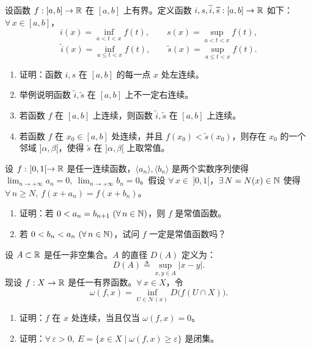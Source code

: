 \begin{exercise}
	\item 设函数 \(f:[a,b]\to\mathbb{R}\) 在 \([a,b]\) 上有界。定义函数 \(i,s,\widetilde i,\widetilde s:[a,b]\to\mathbb{R}\) 如下：\(\forall\,x\in[a,b]\)，
	\[
	i(x)=\inf_{a<t<x}f(t),\qquad s(x)=\sup_{a<t<x}f(t),
	\]
	\[
	\widetilde i(x)=\inf_{a\le t<x}f(t),\qquad \widetilde s(x)=\sup_{a\le t<x}f(t).
	\]
	\begin{enumerate}[label=\arabic*)]
		\item 证明：函数 \(i,s\) 在 \([a,b]\) 的每一点 \(x\) 处左连续。
		\item 举例说明函数 \(\widetilde i,\widetilde s\) 在 \([a,b]\) 上不一定右连续。
		\item 若函数 \(f\) 在 \([a,b]\) 上连续，则函数 \(\widetilde i,\widetilde s\) 在 \([a,b]\) 上连续。
		\item 若函数 \(f\) 在 \(x_0\in[a,b]\) 处连续，并且 \(f(x_0)<\widetilde s(x_0)\)，则存在 \(x_0\) 的一个邻域 \(]\alpha,\beta[\)，使得 \(\widetilde s\) 在 \(]\alpha,\beta[\) 上取常值。
	\end{enumerate}
\end{exercise}

\begin{exercise}
	\item 设 \(f:\ ]0,1[\to\mathbb{R}\) 是任一连续函数，\(\langle a_n\rangle,\langle b_n\rangle\) 是两个实数序列使得 \(\lim_{n\to+\infty}a_n=0,\ \lim_{n\to+\infty}b_n=0\)。假设 \(\forall\,x\in\ ]0,1[\)，\(\exists\,N=N(x)\in\mathbb{N}\) 使得 \(\forall\,n\ge N,\ f(x+a_n)=f(x+b_n)\)。
	\begin{enumerate}[label=\arabic*)]
		\item 证明：若 \(0<a_n=b_{n+1}\ (\forall\,n\in\N)\)，则 \(f\) 是常值函数。
		\item 若 \(0<b_n<a_n\ (\forall\,n\in\N)\)，试问 \(f\) 一定是常值函数吗？
	\end{enumerate}
\end{exercise}

\begin{exercise}
	\item 设 \(A\subset\mathbb{R}\) 是任一非空集合。\(A\) 的直径 \(D(A)\) 定义为：
	\[
	D(A)\triangleq\sup_{x,y\in A}|x-y|.
	\]
	现设 \(f:X\to\mathbb{R}\) 是任一有界函数。\(\forall\,x\in X\)，令
	\[
	\omega(f,x)=\inf_{U\in\mathscr N(x)}D\bigl(f(U\cap X)\bigr).
	\]
	\begin{enumerate}[label=\arabic*)]
		\item 证明：\(f\) 在 \(x\) 处连续，当且仅当 \(\omega(f,x)=0\)。
		\item 证明：\(\forall\,\varepsilon>0,\ E=\{x\in X\mid\omega(f,x)\ge\varepsilon\}\) 是闭集。
	\end{enumerate}
\end{exercise}

